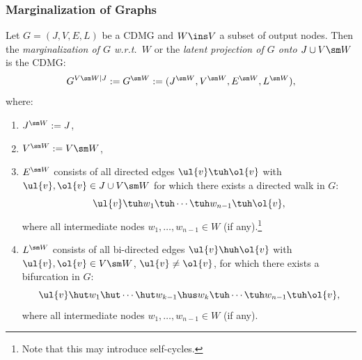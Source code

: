 \subsubsection{Marginalization of Graphs}

\begin{Def}\label{def:G_marginalization}
  Let $G=(J,V,E,L)$ be a CDMG and $W \ins V$ a subset of output nodes.
  Then the \emph{marginalization of $G$ w.r.t.\ $W$} or the \emph{latent projection of $G$ onto $J\cup V \sm W$} is the CDMG:
  \[  G^{V\sm W | J} := G^{\sm W} := (J^{\sm W},V^{\sm W},E^{\sm W},L^{\sm W}), \] 
  where:
  \begin{enumerate}[label=\roman*.)]
      \item $J^{\sm W}:= J$,
      \item $V^{\sm W}:= V \sm W$,
      \item $E^{\sm W}$ consists of all directed edges $\ul{v} \tuh \ol{v}$ with $\ul{v},\ol{v} \in J \cup V \sm W$ 
          for which there exists a directed walk in $G$:
          \[\ul{v} \tuh w_1 \tuh \cdots \tuh w_{n-1} \tuh \ol{v}, \]
          where all intermediate nodes $w_1,\dots,w_{n-1} \in W$ (if any).\footnote{Note that this may introduce self-cycles.}
      \item $L^{\sm W}$ consists of all bi-directed edges $\ul{v} \huh \ol{v}$ with 
          $\ul{v},\ol{v} \in V \sm W$, $\ul{v} \neq \ol{v}$, 
          for which there exists a bifurcation in $G$:
          \[\ul{v} \hut w_1 \hut \cdots \hut w_{k-1} \hus w_k \tuh \cdots \tuh w_{n-1} \tuh \ol{v}, \]
          where all intermediate nodes $w_1,\dots,w_{n-1} \in W$ (if any).
  \end{enumerate}
\end{Def}


